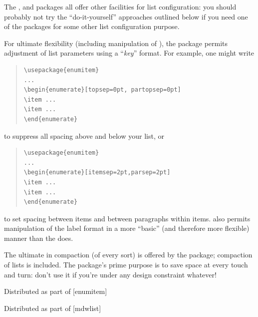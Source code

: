 The ,  and 
packages all offer other facilities for list configuration: you should
probably not try the ``do-it-yourself'' approaches outlined below if
you need one of the packages for some other list configuration
purpose.

For ultimate flexibility (including manipulation of ), the
 package permits adjustment of list parameters using
a ``\emph{key}\latexhtml{\ensuremath{=}}{=}'' format.
For example, one might write
\begin{quote}
\begin{verbatim}
\usepackage{enumitem}
...
\begin{enumerate}[topsep=0pt, partopsep=0pt]
\item ...
\item ...
\end{enumerate}
\end{verbatim}
\end{quote}
to suppress all spacing above and below your list, or
\begin{quote}
\begin{verbatim}
\usepackage{enumitem}
...
\begin{enumerate}[itemsep=2pt,parsep=2pt]
\item ...
\item ...
\end{enumerate}
\end{verbatim}
\end{quote}
to set spacing between items and between paragraphs within items.
 also permits manipulation of the label format in a
more ``basic'' (and therefore more flexible) manner than the %
 does.

The ultimate in compaction (of every sort) is offered by the
 package; compaction of lists is included.  The
package's prime purpose is to save space at every touch and turn:
don't use it if you're under any design constraint whatever!
\begin{ctanrefs}
\item[enumerate.sty]Distributed as part of [enumitem]
\item[enumitem.sty]
\item[expdlist.sty]
\item[memoir.cls]
\item[memoir \nothtml{\rmfamily}manual]
\item[mdwlist.sty]Distributed as part of [mdwlist]
\item[multenum.sty]
\item[paralist.sty]
\item[savetrees.sty]
\end{ctanrefs}


